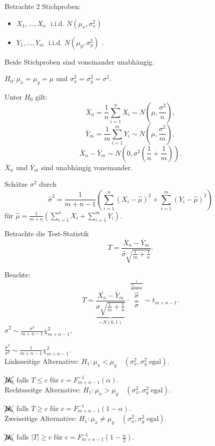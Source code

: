 \documentclass{tstextbook}
\begin{document}
\begin{example}
	
	Betrachte 2 Stichproben: 
	\begin{itemize}
		\item $ X_1,\ldots,X_n \;$ i.i.d. $ N\left(\mu_x, \sigma_x^2\right) $ 
		\item $ Y_1,\ldots,Y_m \;$ i.i.d. $ N\left(\mu_y, \sigma_y^2\right) $ .
	\end{itemize}

	Beide Stichproben sind voneinander unabhängig.
	
	$ H_0 \colon \mu_x = \mu_y = \mu $ und $ \sigma_x^2=\sigma_y^2=\sigma^2 $.
	
	Unter $ H_0 $ gilt: 
	\[
	\bar{X}_n=\frac{1}{n}\sum_{i=1}^{n}X_i \sim N\left(\mu,\frac{\sigma^2}{n}\right),
	\]
	\[
	\bar{Y}_m=\frac{1}{m}\sum_{i=1}^{m}Y_i \sim N\left(\mu,\frac{\sigma^2}{m}\right),
	\]
		\[
	\bar{X}_n - \bar{Y}_m \sim N\left(0, \sigma^2\left(\frac{1}{n}+\frac{1}{m}\right)\right). 
	\]
	$ \bar{X}_n $ und $ \bar{Y}_m $ sind unabhängig voneinander.
	
	Schätze $ \sigma^2 $ durch 
	\[
	\hat{\sigma}^2 = \frac{1}{m+n-1}\left(\sum_{i=1}^{n}(X_i-\hat{\mu})^2+\sum_{i=1}^{m}(Y_i-\hat{\mu})^2\right)
	\]
	für $ \hat{\mu} = \frac{1}{m+n} \left(\sum_{i=1}^{n}X_i+\sum_{i=1}^{m}Y_i\right) $.
	
	Betrachte die Test-Statistik
	\[
	T=\frac{\bar{X}_n-\bar{Y}_m}{\hat{\sigma}\sqrt{\frac{1}{m}+\frac{1}{n}}}.
	\]
	
	Beachte: 
	\[
	T = \frac{\bar{X_n}-\bar{Y}_m}{\underbrace{\sigma\sqrt{\frac{1}{m}+\frac{1}{n}}}_{\sim N(0,1)}} \cdot \overbrace{\frac{\sigma}{\hat{\sigma}}}^{\frac{1}{\frac{\chi^2_{m+n-1}}{m+n-1}}} \sim t_{m+n-1}.
	\]
	$ \hat{\sigma}^2 \sim \frac{\sigma^2}{m+n-1} \chi^2_{m+n-1} $, 
	
	$ \frac{\hat{\sigma}^2}{\sigma^2} \sim \frac{1}{m+n-1} \chi^2_{m+n-1} $. \\
	
	Linksseitige Alternative: $ H_1\colon \mu_x < \mu_y \quad (\sigma_x^2, \sigma_y^2 \; \text{egal}) $. 
	
	$ \xcancel{H_0} $ falls $ T \le c $ für $ c = F_{m+n-1}^{-1}(\alpha) $. \\
	

	Rechtsseitge Alternative: $ H_1\colon \mu_x > \mu_y \quad (\sigma_x^2, \sigma_y^2 \; \text{egal}) $. 
	
	$ \xcancel{H_0} $ falls $ T \ge c $ für $ c = F_{m+n-1}^{-1}(1-\alpha) $. \\
	

	Zweiseitige Alternative: $ H_1\colon \mu_x \ne \mu_y \quad (\sigma_x^2, \sigma_y^2 \; \text{egal}) $. 
	
	$ \xcancel{H_0} $ falls $ |T| \ge c $ für $ c = F_{m+n-1}^{-1}\left(1-\frac{\alpha}{2}\right) $.
\end{example}
\end{document}

